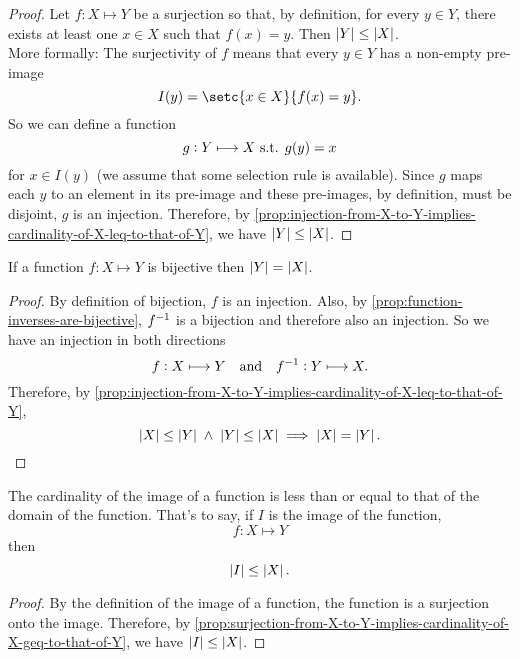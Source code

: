 \documentclass[../MathsNotesBase.tex]{subfiles}
\begin{document}
{		\bigskip
		\begin{proof}
			Let ${ f: X \longmapsto Y }$ be a surjection so that, by definition, for every ${ y \in Y }$, there exists at least one ${ x \in X }$ such that ${ f(x) = y }$. Then ${ \left\lvert Y\right\rvert \leq \left\lvert X\right\rvert }$.\\
			
			More formally: The surjectivity of $f$ means that every ${ y \in Y }$ has a non-empty pre-image
			\[ I(y) = \setc{x \in X}{f(x) = y}. \]
			So we can define a function
			\[ g: Y \longmapsto X \text{ s.t. } g(y) = x \]
			for ${ x \in I(y) }$ (we assume that some selection rule is available). Since $g$ maps each $y$ to an element in its pre-image and these pre-images, by definition, must be disjoint, $g$ is an injection. Therefore, by \autoref{prop:injection-from-X-to-Y-implies-cardinality-of-X-leq-to-that-of-Y}, we have ${ \left\lvert Y\right\rvert \leq \left\lvert X\right\rvert }$.
		\end{proof}
	
		\begin{corollary}\label{coro:bijection-from-X-to-Y-implies-cardinality-of-X-eq-to-that-of-Y}
			If a function ${ f: X \longmapsto Y }$ is bijective then ${ \left\lvert Y\right\rvert = \left\lvert X\right\rvert }$.
		\end{corollary}
		\begin{proof}
			By definition of bijection, $f$ is an injection. Also, by \autoref{prop:function-inverses-are-bijective}, ${f}^{-1}$ is a bijection and therefore also an injection. So we have an injection in both directions
			\[ f: X \longmapsto Y \hspace{10pt}\text{and}\hspace{10pt} {f}^{-1}: Y \longmapsto X. \]
			Therefore, by \autoref{prop:injection-from-X-to-Y-implies-cardinality-of-X-leq-to-that-of-Y},
			\[ \left\lvert X\right\rvert \leq \left\lvert Y\right\rvert \; \land \; \left\lvert Y\right\rvert \leq \left\lvert X\right\rvert \implies \left\lvert X\right\rvert = \left\lvert Y\right\rvert. \]
		\end{proof}
	
		\begin{corollary}
			The cardinality of the image of a function is less than or equal to that of the domain of the function. That's to say, if $I$ is the image of the function,
			\[ f: X \longmapsto Y \]
			then 
			\[ \left\lvert I\right\rvert \leq \left\lvert X\right\rvert. \]
		\end{corollary}
		\begin{proof}
			By the definition of the image of a function, the function is a surjection onto the image. Therefore, by \autoref{prop:surjection-from-X-to-Y-implies-cardinality-of-X-geq-to-that-of-Y}, we have ${ \left\lvert I\right\rvert \leq \left\lvert X\right\rvert }$.
		\end{proof}
		
}
\end{document}
